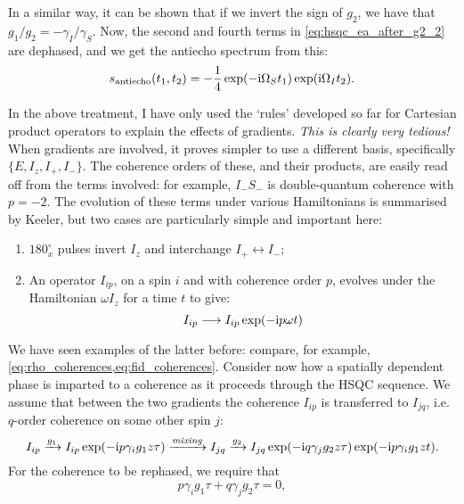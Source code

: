 In a similar way, it can be shown that if we invert the sign of $g_2$, we have that $g_1/g_2 = -\gamma_I/\gamma_S$.
Now, the second and fourth terms in \cref{eq:hsqc_ea_after_g2_2} are dephased, and we get the antiecho spectrum from this:
\begin{equation}
    \label{eq:hsqc_ea_antiecho_signal}
    s_\text{antiecho}(t_1, t_2) = -\frac{1}{4}\exp(-\mathrm{i} \Omega_S t_1)\exp(\mathrm{i} \Omega_I t_2).
\end{equation}

In the above treatment, I have only used the `rules' developed so far for Cartesian product operators to explain the effects of gradients.
\textit{This is clearly very tedious!}
When gradients are involved, it proves simpler to use a different basis, specifically $\{E, I_z, I_+, I_-\}$.
The coherence orders of these, and their products, are easily read off from the terms involved: for example, $I_-S_-$ is double-quantum coherence with $p = -2$.
The evolution of these terms under various Hamiltonians is summarised by Keeler\autocite{Keeler2010}, but two cases are particularly simple and important here:
\begin{enumerate}
    \item $180^\circ_x$ pulses invert $I_z$ and interchange $I_+ \leftrightarrow I_-$;
    \item An operator $I_{ip}$, on a spin $i$ and with coherence order $p$, evolves under the Hamiltonian $\omega I_z$ for a time $t$ to give:
        \begin{equation}
            \label{eq:shift_operator_evolution}
            I_{ip} \longrightarrow I_{ip} \exp(-\mathrm{i} p\omega t)
        \end{equation}
\end{enumerate}
We have seen examples of the latter before: compare, for example, \cref{eq:rho_coherences,eq:fid_coherences}.
Consider now how a spatially dependent phase is imparted to a coherence as it proceeds through the HSQC sequence.
We assume that between the two gradients the coherence $I_{ip}$ is transferred to $I_{jq}$, i.e.\ $q$-order coherence on some other spin $j$:
\begin{equation}
    \label{eq:shift_operator_evolution_grad}
    I_{ip} \xrightarrow[]{g_1} I_{ip} \exp(-\mathrm{i} p \gamma_i g_1 z \tau) \xrightarrow[]{\textit{mixing}} I_{jq} \xrightarrow[]{g_2} I_{jq}\exp(-\mathrm{i} q \gamma_j g_2 z \tau)\exp(-\mathrm{i} p \gamma_i g_1 z t).
\end{equation}
For the coherence to be rephased, we require that
\begin{equation}
    \label{eq:gradient_refocusing_condition}
    p\gamma_i g_1\tau + q\gamma_j g_2\tau = 0,
\end{equation}
